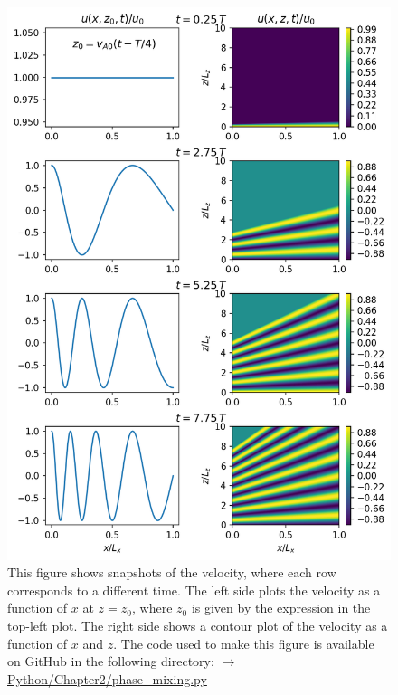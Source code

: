 \begin{figure}
    \centering
    \vspace{-30pt}
    \includegraphics[width=\textwidth,height=0.97\textheight,keepaspectratio]{figures/chapter02/phase_mixing.png}
    \vspace{-10pt}
    \caption{This figure shows snapshots of the velocity, where each row corresponds to a different time. The left side plots the velocity as a function of $x$ at $z=z_0$, where $z_0$ is given by the expression in the top-left plot. The right side shows a contour plot of the velocity as a function of $x$ and $z$. The code used to make this figure is available on GitHub in the following directory:\newline
    \href{https://github.com/aleksyprok/apkp_thesis/blob/main/Python/Chapter2/phase_mixing.py}{$\rightarrow$ Python/Chapter2/phase\_mixing.py}}
    \vspace{-30pt}
    \label{fig:chap_2_phase_mixing}
\end{figure}

